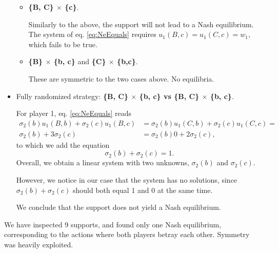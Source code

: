 \begin{example}
\begin{itemize}
\begin{itemize}
\item \textbf{\{B, C\} $\times$ \{c\}}.

Similarly to the above, the support will not lead to a Nash equilibrium. The system of eq. \ref{eq:NeEquals} requires $u_1(B,c) = u_1(C,c) = w_1, $ which fails to be true.

\item \textbf{\{B\} $\times$ \{b, c\}} and \textbf{\{C\} $\times$ \{b,c\}}.

These are  symmetric to the two cases above. No equilibria.

\end{itemize}
\item Fully randomized strategy: \textbf{\{B, C\} $\times$ \{b, c\} vs \{B, C\} $\times$ \{b, c\}}.

For player 1, eq. \ref{eq:NeEquals} reads
$$
\begin{aligned}
 \sigma_2(b)u_1(B,b) + \sigma_2(c)u_1(B,c) & = \sigma_2(b)u_1(C,b) + \sigma_2(c)u_1(C,c)= \\
 \sigma_2(b) + 3 \sigma_2(c) & = \sigma_2(b) 0 + 2 \sigma_2(c), 
 \end{aligned}
$$
to which we add the equation 
$$ \sigma_2(b) + \sigma_2(c) = 1.$$
Overall, we obtain a linear system with two unknowns, $\sigma_2(b)$ and $\sigma_2(c)$. 

However, we notice in our case that the system has no solutions, since $\sigma_2(b) + \sigma_2(c)$ should both equal 1 and 0 at the same time.

We conclude that the support does not yield a Nash equilibrium.
\end{itemize} 

We have inspected 9 supports, and found only one Nash equilibrium, corresponding to the actions where both players betray each other. Symmetry was heavily exploited.

\label{chap3:ex:pdilemma}
\end{example}

